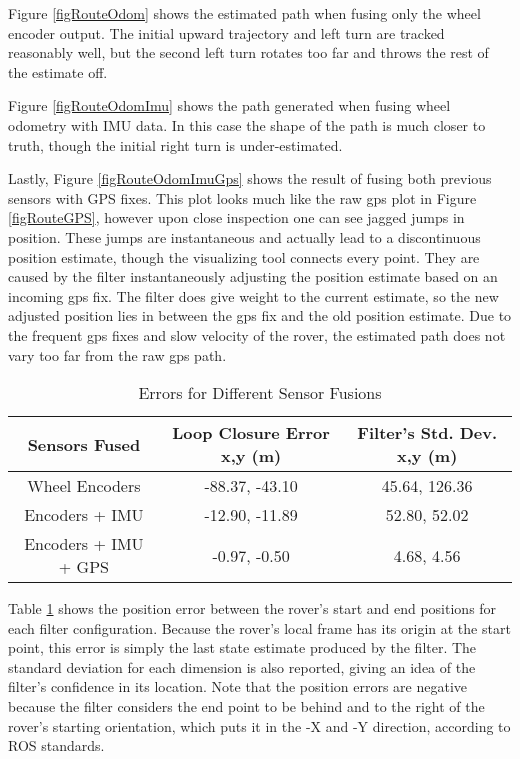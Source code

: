 Figure \ref{figRouteOdom} shows the estimated path when fusing only the wheel encoder output. The initial upward trajectory and left turn are tracked reasonably well, but the second left turn rotates too far and throws the rest of the estimate off.

Figure \ref{figRouteOdomImu} shows the path generated when fusing wheel odometry with IMU data. In this case the shape of the path is much closer to truth, though the initial right turn is under-estimated.

Lastly, Figure \ref{figRouteOdomImuGps} shows the result of fusing both previous sensors with GPS fixes. This plot looks much like the raw gps plot in Figure \ref{figRouteGPS}, however upon close inspection one can see jagged jumps in position. These jumps are instantaneous and actually lead to a discontinuous position estimate, though the visualizing tool connects every point. They are caused by the filter instantaneously adjusting the position estimate based on an incoming gps fix. The filter does give weight to the current estimate, so the new adjusted position lies in between the gps fix and the old position estimate. Due to the frequent gps fixes and slow velocity of the rover, the estimated path does not vary too far from the raw gps path.

\begin{table}[h]
	\caption {Errors for Different Sensor Fusions \cite{robot_localization_paper}} \label{tab:errors} 
	\begin{center}
		\begin{tabular}{|c|c|c|} \hline
			\textbf{Sensors Fused} & \textbf{Loop Closure Error x,y (m)} & \textbf{Filter's Std. Dev. x,y (m)} \\ \hline
			Wheel Encoders & -88.37, -43.10 & 45.64, 126.36 \\ \hline
			Encoders + IMU & -12.90, -11.89 & 52.80,  52.02 \\ \hline
			Encoders + IMU + GPS & -0.97, -0.50 & 4.68,  4.56 \\ \hline
		\end{tabular}
	\end{center}
\end{table}

Table \ref{tab:errors} shows the position error between the rover's start and end positions for each filter configuration. Because the rover's local frame has its origin at the start point, this error is simply the last state estimate produced by the filter. The standard deviation for each dimension is also reported, giving an idea of the filter's confidence in its location. Note that the position errors are negative because the filter considers the end point to be behind and to the right of the rover's starting orientation, which puts it in the -X and -Y direction, according to ROS standards.

